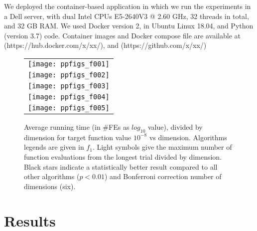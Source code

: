 We deployed the container-based application in which we run the experiments in a
Dell server,  with dual Intel CPUs E5-2640V3 @ 2.60 GHz, 32 threads in total,
and 32 GB RAM. We used Docker version 2, in Ubuntu Linux 18.04, and Python
(version 3.7) code.  Container images and Docker compose file are available at
(https://hub.docker.com/x/xx/), and (https://github.com/x/xx/)


\begin{figure}[h!tb]
  \begin{tabular}
      {c@{\hspace*{-0.00001\textwidth}}
      }
     
  \texttt{[image: ppfigs\_f001]}\\
  \texttt{[image: ppfigs\_f002]}\\

  \texttt{[image: ppfigs\_f003]}\\
  \texttt{[image: ppfigs\_f004]}\\
  
  \texttt{[image: ppfigs\_f005]}\\
  \end{tabular}
  \vspace{-3ex}
   \caption{Average running time (in \#FEs as $log_{10}$ value),
    divided by dimension for target function value $10^{-8}$ vs dimension. 
    Algorithms legends are given in $f_1$. Light symbols give the maximum number of 
    function evaluations from the longest trial divided by dimension. 
    Black stars indicate a statistically better result compared to 
    all other algorithms ($p < 0.01$) and Bonferroni 
    correction number of dimensions (six).}
\end{figure}  

\section{Results}
\label{results}







